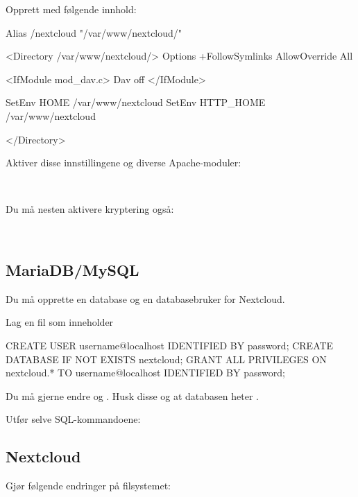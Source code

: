 Opprett  med følgende innhold:

\begin{filedata}
Alias /nextcloud "/var/www/nextcloud/"

<Directory /var/www/nextcloud/>
  Options +FollowSymlinks
  AllowOverride All

 <IfModule mod_dav.c>
  Dav off
 </IfModule>

 SetEnv HOME /var/www/nextcloud
 SetEnv HTTP_HOME /var/www/nextcloud

</Directory>
\end{filedata}

Aktiver disse innstillingene og diverse Apache-moduler:

\\

Du må nesten aktivere kryptering også:

\\

\subsection{MariaDB/MySQL}

Du må opprette en database og en databasebruker for Nextcloud.

Lag en fil  som inneholder

\begin{filedata}
CREATE USER \tqs{}username\tqs{}@\tqs{}localhost\tqs{} IDENTIFIED BY \tqs{}password\tqs{};
CREATE DATABASE IF NOT EXISTS nextcloud;
GRANT ALL PRIVILEGES ON nextcloud.* TO 
  \tqs{}username\tqs{}@\tqs{}localhost\tqs{} IDENTIFIED BY \tqs{}password\tqs{};
\end{filedata}

Du må gjerne endre  og . 
Husk disse og at databasen heter .

Utfør selve SQL-kommandoene:


\subsection{Nextcloud}

Gjør følgende endringer på filsystemet:

\\
\\

